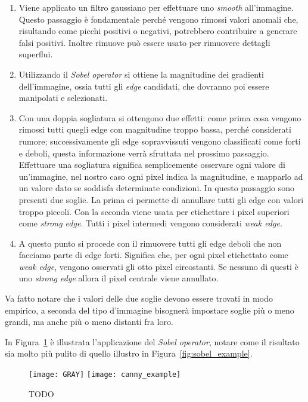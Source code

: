\begin{enumerate}
  \item Viene applicato un filtro gaussiano per effettuare uno \textit{smooth} all'immagine.
    Questo passaggio è fondamentale perché vengono rimossi valori anomali che, risultando come picchi positivi o negativi, potrebbero contribuire a generare falsi positivi.
    Inoltre rimuove può essere usato per rimuovere dettagli superflui.

  \item Utilizzando il \textit{Sobel operator} si ottiene la magnitudine dei gradienti dell'immagine, ossia tutti gli \textit{edge} candidati, che dovranno poi essere manipolati e selezionati.


  \item Con una doppia sogliatura si ottengono due effetti:
    come prima cosa vengono rimossi tutti quegli edge con magnitudine troppo bassa, perché considerati rumore;
    successivamente gli edge sopravvissuti vengono classificati come forti e deboli, questa informazione verrà sfruttata nel prossimo passaggio.
    Effettuare una sogliatura significa semplicemente osservare ogni valore di un'immagine, nel nostro caso ogni pixel indica la magnitudine, e mapparlo ad un valore dato se soddisfa determinate condizioni.
    In questo passaggio sono presenti due soglie.
    La prima ci permette di annullare tutti gli edge con valori troppo piccoli.
    Con la seconda viene usata per etichettare i pixel superiori come \textit{strong edge}.
    Tutti i pixel intermedi vengono considerati \textit{weak edge}.

  \item A questo punto si procede con il rimuovere tutti gli edge deboli che non facciamo parte di edge forti.
    Significa che, per ogni pixel etichettato come \textit{weak edge}, vengono osservati gli otto pixel circostanti.
    Se nessuno di questi è uno \textit{strong edge} allora il pixel centrale viene annullato.

\end{enumerate}
Va fatto notare che i valori delle due soglie devono essere trovati in modo empirico, a seconda del tipo d'immagine bisognerà impostare soglie più o meno grandi, ma anche più o meno distanti fra loro.

In Figura~\ref{fig:canny_example} è illustrata l'applicazione del \textit{Sobel operator}, notare come il risultato sia molto più pulito di quello illustro in Figura~\ref{fig:sobel_example}.
\begin{figure}[ht] %
  \begin{center}
    \texttt{[image: GRAY]}
    \texttt{[image: canny\_example]}
    \caption{TODO }
    \label{fig:canny_example}
  \end{center}
\end{figure}


